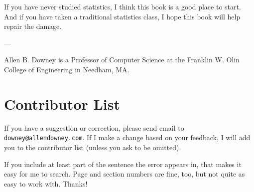 \documentclass[12pt]{book}
\theoremstyle{exercise}
\begin{document}
If you have never studied statistics, I think this book is a good place
to start.  And if you have taken
a traditional statistics class, I hope this book will help repair the
damage.



---

Allen B. Downey is a Professor of Computer Science at 
the Franklin W. Olin College of Engineering in Needham, MA.




\section*{Contributor List}

If you have a suggestion or correction, please send email to 
{\tt downey@allendowney.com}.  If I make a change based on your
feedback, I will add you to the contributor list
(unless you ask to be omitted).%

If you include at least part of the sentence the
error appears in, that makes it easy for me to search.  Page and
section numbers are fine, too, but not quite as easy to work with.
Thanks!

\small
\end{document}
